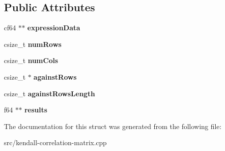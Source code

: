 \subsection*{Public Attributes}
\begin{DoxyCompactItemize}
\item 
\mbox{\label{structtauCorrHelpStructCrossReference_a74acec2aba8e44d712aba0a6bd8dcb85}} 
cf64 $\ast$$\ast$ {\bfseries expression\+Data}
\item 
\mbox{\label{structtauCorrHelpStructCrossReference_a9250ad1ed1005faaa5be888052604ba3}} 
csize\+\_\+t {\bfseries num\+Rows}
\item 
\mbox{\label{structtauCorrHelpStructCrossReference_a7077820518ebe7fe6109149f6f9549da}} 
csize\+\_\+t {\bfseries num\+Cols}
\item 
\mbox{\label{structtauCorrHelpStructCrossReference_a8f670f125a3faad96d4b7539dbf042c1}} 
csize\+\_\+t $\ast$ {\bfseries against\+Rows}
\item 
\mbox{\label{structtauCorrHelpStructCrossReference_ad33ae580179b325c9d8511a7aede598b}} 
csize\+\_\+t {\bfseries against\+Rows\+Length}
\item 
\mbox{\label{structtauCorrHelpStructCrossReference_a5a422c383ff264593bba2d58285d4e11}} 
f64 $\ast$$\ast$ {\bfseries results}
\end{DoxyCompactItemize}


The documentation for this struct was generated from the following file\+:\begin{DoxyCompactItemize}
\item 
src/kendall-\/correlation-\/matrix.\+cpp\end{DoxyCompactItemize}
